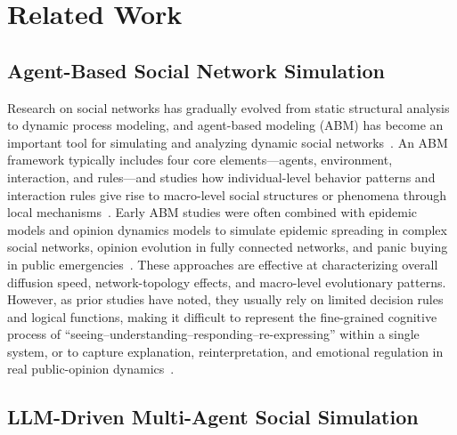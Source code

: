\section{Related Work}

\subsection{Agent-Based Social Network Simulation}

Research on social networks has gradually evolved from static structural analysis to dynamic process modeling, and agent-based modeling (ABM) has become an important tool for simulating and analyzing dynamic social networks~\citep{li2026abm, gilbert2008agent, wang2025abm}. An ABM framework typically includes four core elements---agents, environment, interaction, and rules---and studies how individual-level behavior patterns and interaction rules give rise to macro-level social structures or phenomena through local mechanisms~\citep{gilbert2008agent, vespignani2012modelling, gaoj2016universal}. Early ABM studies were often combined with epidemic models and opinion dynamics models to simulate epidemic spreading in complex social networks, opinion evolution in fully connected networks, and panic buying in public emergencies~\citep{wu2024epidemic, alatas2017opinion, fan2024panic}. These approaches are effective at characterizing overall diffusion speed, network-topology effects, and macro-level evolutionary patterns. However, as prior studies have noted, they usually rely on limited decision rules and logical functions, making it difficult to represent the fine-grained cognitive process of “seeing--understanding--responding--re-expressing” within a single system, or to capture explanation, reinterpretation, and emotional regulation in real public-opinion dynamics~\citep{li2026abm, gaoc2024survey}.

\subsection{LLM-Driven Multi-Agent Social Simulation}

